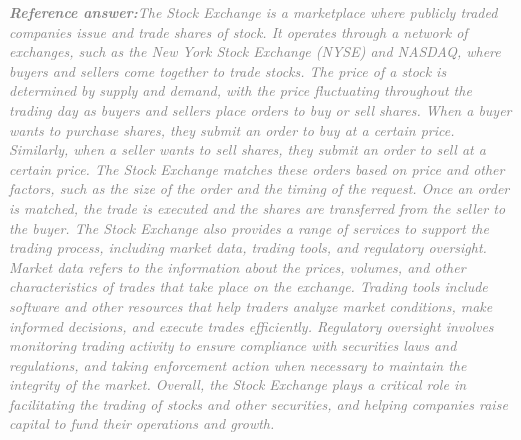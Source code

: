 \documentclass[a4paper,11pt]{article}
\begin{document}
\begin{refanswerenv}
{\footnotesize\textit{\textcolor{gray}{\textbf{Reference answer:}\enspace The Stock Exchange is a marketplace where publicly traded companies issue and trade shares of stock. It operates through a network of exchanges, such as the New York Stock Exchange (NYSE) and NASDAQ, where buyers and sellers come together to trade stocks. The price of a stock is determined by supply and demand, with the price fluctuating throughout the trading day as buyers and sellers place orders to buy or sell shares.
When a buyer wants to purchase shares, they submit an order to buy at a certain price. Similarly, when a seller wants to sell shares, they submit an order to sell at a certain price. The Stock Exchange matches these orders based on price and other factors, such as the size of the order and the timing of the request. Once an order is matched, the trade is executed and the shares are transferred from the seller to the buyer.
The Stock Exchange also provides a range of services to support the trading process, including market data, trading tools, and regulatory oversight. Market data refers to the information about the prices, volumes, and other characteristics of trades that take place on the exchange. Trading tools include software and other resources that help traders analyze market conditions, make informed decisions, and execute trades efficiently. Regulatory oversight involves monitoring trading activity to ensure compliance with securities laws and regulations, and taking enforcement action when necessary to maintain the integrity of the market.
Overall, the Stock Exchange plays a critical role in facilitating the trading of stocks and other securities, and helping companies raise capital to fund their operations and growth.}}}
\end{refanswerenv}
\end{document}

